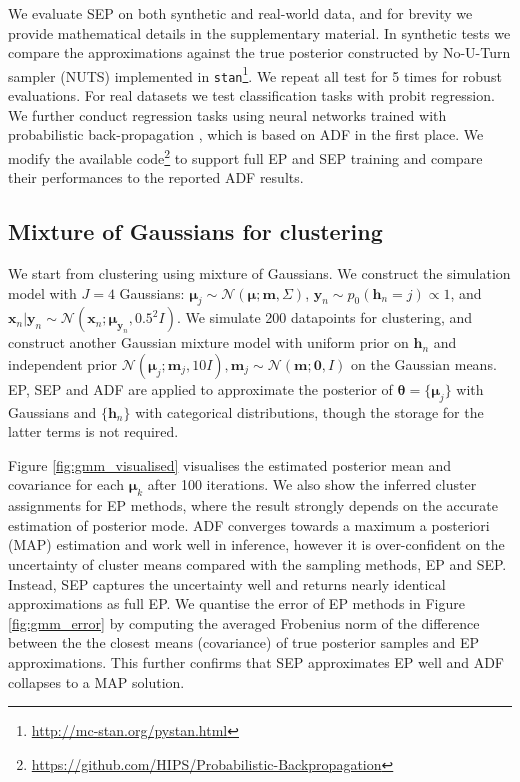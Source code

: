 We evaluate SEP on both synthetic and real-world data, and for brevity we provide mathematical details in the supplementary material. In synthetic tests we compare the approximations against the true posterior constructed by No-U-Turn sampler (NUTS) \cite{hoffman:nuts} implemented in \texttt{stan}\footnote{\url{http://mc-stan.org/pystan.html}}. We repeat all test for 5 times for robust evaluations.
%
For real datasets we test classification tasks with probit regression. We further conduct regression tasks using neural networks trained with probabilistic back-propagation \cite{miguel:pbp}, which is based on ADF in the first place. We modify the available code\footnote{\url{https://github.com/HIPS/Probabilistic-Backpropagation}} to support full EP and SEP training and compare their performances to the reported ADF results.

%
\subsection{Mixture of Gaussians for clustering}
We start from clustering using mixture of Gaussians. We construct the simulation model with $J=4$ Gaussians: $\bm{\mu}_j \sim \mathcal{N}(\bm{\mu}; \bm{m}, \Sigma)$, $\bm{y}_n \sim p_0(\bm{h}_n = j) \propto 1$, and $\bm{x}_n | \bm{y}_n \sim \mathcal{N}(\bm{x}_n; \bm{\mu}_{\bm{y}_n}, 0.5^2 I)$. We simulate 200 datapoints for clustering, and construct another Gaussian mixture model with uniform prior on $\bm{h}_n$ and independent prior $\mathcal{N}(\bm{\mu}_j; \bm{m}_j, 10I), \bm{m}_j \sim \mathcal{N}(\bm{m}; \bm{0}, I)$ on the Gaussian means. EP, SEP and ADF are applied to approximate the posterior of $\bm{\theta} = \{ \bm{\mu}_j \}$ with Gaussians and $\{\bm{h}_n\}$ with categorical distributions, though the storage for the latter terms is not required. 

Figure \ref{fig:gmm_visualised} visualises the estimated posterior mean and covariance for each $\bm{\mu}_k$ after 100 iterations. We also show the inferred cluster assignments for EP methods, where the result strongly depends on the accurate estimation of posterior mode. ADF converges towards a maximum a posteriori (MAP) estimation and work well in inference, however it is over-confident on the uncertainty of cluster means compared with the sampling methods, EP and SEP. Instead, SEP captures the uncertainty well and returns nearly identical approximations as full EP. We quantise the error of EP methods in Figure \ref{fig:gmm_error} by computing the averaged Frobenius norm of the difference between the the closest means (covariance) of true posterior samples and EP approximations. This further confirms that SEP approximates EP well and ADF collapses to a MAP solution.

